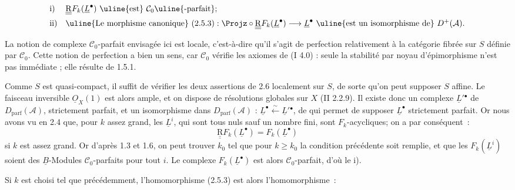 
\[
\begin{array}{ll}
\mathrm{i)}& \underline{\underline{\mathrm R}} F_k(\underline{L}^{\bullet})\text{ \uline{est} }\mathcal C_0
\text{\uline{-parfait}};\\[2mm]
\mathrm{ii)}& \text{\uline{Le morphisme canonique} }(2.5.3):
\Projz\circ\underline{\underline{\mathrm R}} F_k(\underline{L}^{\bullet})\longrightarrow \underline{L}^{\bullet}
\text{ \uline{est un isomorphisme de} }D^+(\mathcal A).
\end{array}
\]

La notion de complexe $\mathcal C_0$-parfait envisagée ici est locale, c'est-à-dire qu'il s'agit de perfection relativement à la catégorie fibrée sur $S$ définie par $\mathcal C_0$. Cette notion de perfection a bien un sens, car $\mathcal C_0$ vérifie les axiomes de (I 4.0) : seule la stabilité par noyau d'épimorphisme n'est pas immédiate ; elle résulte de 1.5.1.

Comme $S$ est quasi-compact, il suffit de vérifier les deux assertions de 2.6 localement sur $S$, de sorte qu'on peut supposer $S$ affine. Le faisceau inversible $\underline{O}_X(1)$ est alors ample, et on dispose de résolutions globales sur $X$ (II 2.2.9). Il existe donc un complexe $\underline{L}'{}^{\bullet}$ de $D_{\mathrm{parf}}(\mathcal A)$, strictement parfait, et un isomorphisme dans $D_{\mathrm{parf}}(\mathcal A)$ : $\underline{L}^{\bullet}\xleftarrow{\sim}\underline{L}'{}^{\bullet}$, de qui permet de supposer $\underline{L}^{\bullet}$ strictement parfait. Or nous avons vu en 2.4 que, pour $k$ assez grand, les $\underline{L}^i$, qui sont tous nuls sauf un nombre fini, sont $F_k$-acycliques; on a par conséquent~:
\[
  \underline{\underline{\mathrm R}} F_k(\underline{L}^{\bullet})=F_k(\underline{L}^{\bullet})
\]
si $k$ est assez grand. Or d'après 1.3 et 1.6, on peut trouver $k_0$ tel que pour $k\geq k_0$ la condition précédente soit remplie, et que les $F_k(\underline{L}^i)$ soient des $\underline{B}$-Modules $\mathcal C_0$-parfaits pour tout $i$. Le complexe $F_k(\underline{L}^{\bullet})$ est alors $\mathcal C_0$-parfait, d'où le i).

Si $k$ est choisi tel que précédemment, l'homomorphisme (2.5.3) est alors l'homomorphisme~:
